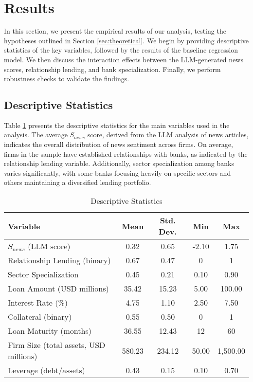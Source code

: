 \section{Results}
\label{sec:results}

In this section, we present the empirical results of our analysis, testing the hypotheses outlined in Section \ref{sec:theoretical}. We begin by providing descriptive statistics of the key variables, followed by the results of the baseline regression model. We then discuss the interaction effects between the LLM-generated news scores, relationship lending, and bank specialization. Finally, we perform robustness checks to validate the findings.

\subsection{Descriptive Statistics}

Table \ref{tab:descriptives} presents the descriptive statistics for the main variables used in the analysis. The average $S_{news}$ score, derived from the LLM analysis of news articles, indicates the overall distribution of news sentiment across firms. On average, firms in the sample have established relationships with banks, as indicated by the relationship lending variable. Additionally, sector specialization among banks varies significantly, with some banks focusing heavily on specific sectors and others maintaining a diversified lending portfolio.

\begin{table}[htbp]
\centering
\caption{Descriptive Statistics}
\label{tab:descriptives}
\begin{tabular}{lcccc}
\hline
\textbf{Variable} & \textbf{Mean} & \textbf{Std. Dev.} & \textbf{Min} & \textbf{Max} \\
\hline
$S_{news}$ (LLM score) & 0.32 & 0.65 & -2.10 & 1.75 \\
Relationship Lending (binary) & 0.67 & 0.47 & 0 & 1 \\
Sector Specialization & 0.45 & 0.21 & 0.10 & 0.90 \\
Loan Amount (USD millions) & 35.42 & 15.23 & 5.00 & 100.00 \\
Interest Rate (\%) & 4.75 & 1.10 & 2.50 & 7.50 \\
Collateral (binary) & 0.55 & 0.50 & 0 & 1 \\
Loan Maturity (months) & 36.55 & 12.43 & 12 & 60 \\
Firm Size (total assets, USD millions) & 580.23 & 234.12 & 50.00 & 1,500.00 \\
Leverage (debt/assets) & 0.43 & 0.15 & 0.10 & 0.70 \\
\hline
\end{tabular}
\end{table}

